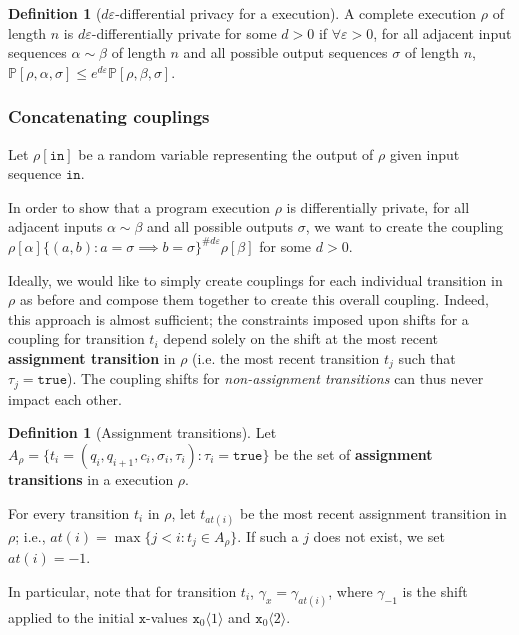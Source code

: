 \documentclass[12pt]{article}
\newcommand{\PP}{\mathbb{P}}
\newcommand{\brangle}[1]{\langle #1 \rangle}
\theoremstyle{definition}
\newtheorem{defn}[thm]{Definition}
\begin{document}
\begin{defn}[$d\varepsilon$-differential privacy for a execution]
    A complete execution $\rho$ of length $n$ is $d\varepsilon$-differentially private for some $d>0$ if $\forall \varepsilon>0$, for all adjacent input sequences $\alpha\sim \beta$ of length $n$ and all possible output sequences $\sigma$ of length $n$, $\PP[\rho, \alpha, \sigma]\leq e^{d\varepsilon}\PP[\rho, \beta, \sigma]$.
\end{defn}

\subsubsection{Concatenating couplings}

Let $\rho[\texttt{in}]$ be a random variable representing the output of $\rho$ given input sequence $\texttt{in}$. 

In order to show that a program execution $\rho$ is differentially private, for all adjacent inputs $\alpha\sim\beta$ and all possible outputs $\sigma$, we want to create the coupling $\rho[\alpha]\{(a, b): a=\sigma\implies b=\sigma\}^{\#d\varepsilon}\rho[\beta]$ for some $d>0$. 

Ideally, we would like to simply create couplings for each individual transition in $\rho$ as before and compose them together to create this overall coupling. Indeed, this approach is almost sufficient; the constraints imposed upon shifts for a coupling for transition $t_i$ depend solely on the shift at the most recent \textbf{assignment transition} in $\rho$ (i.e. the most recent transition $t_j$ such that $\tau_j = \texttt{true}$). 
The coupling shifts for \textit{non-assignment transitions} can thus never impact each other. 

\begin{defn}[Assignment transitions]
    Let $A_\rho = \{t_i=(q_i, q_{i+1}, c_i, \sigma_i, \tau_i): \tau_i = \texttt{true}\}$ be the set of \textbf{assignment transitions} in a execution $\rho$. 

    For every transition $t_i$ in $\rho$, let $t_{at(i)}$ be the most recent assignment transition in $\rho$; i.e., $at(i) = \max\{j<i: t_j\in A_\rho\}$. If such a $j$ does not exist, we set $at(i)=-1$. 
\end{defn}

In particular, note that for transition $t_i$, $\gamma_x = \gamma_{at(i)}$, where $\gamma_{-1}$ is the shift applied to the initial $\texttt{x}$-values $\texttt{x}_0\brangle{1}$ and $\texttt{x}_0\brangle{2}$.
\end{document}
